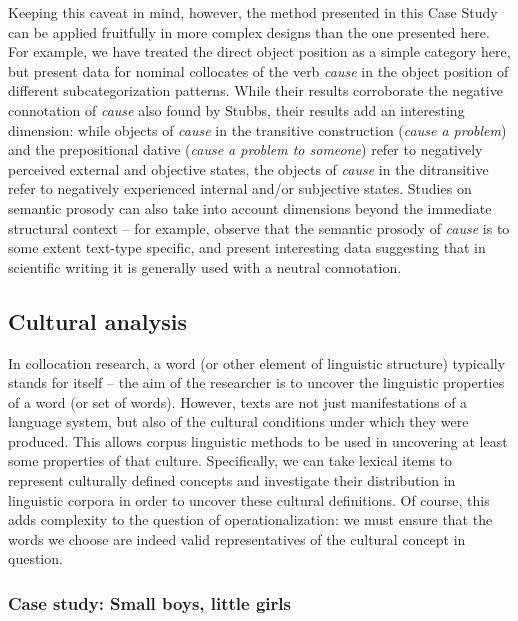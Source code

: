 Keeping this caveat in mind, however, the method presented in this Case Study can be applied fruitfully in more complex designs than the one presented here. For example, we have treated the direct object position as a simple category here, but \citet{stefanowitsch_collostructions:_2003} present data for nominal collocates of the verb \textit{cause} in the object position of different subcategorization patterns. While their results corroborate the negative connotation of \textit{cause} also found by Stubbs, their results add an interesting dimension: while objects of \textit{cause} in the transitive construction (\textit{cause a problem}) and the prepositional dative (\textit{cause a problem to someone}) refer to negatively perceived external and objective states, the objects of \textit{cause} in the ditransitive refer to negatively experienced internal and/or subjective states. Studies on semantic prosody can also take into account dimensions beyond the immediate structural context -- for example, \citet{louw_semantic_2010} observe that the semantic prosody of \textit{cause} is to some extent text-type specific, and present interesting data suggesting that in scientific writing it is generally used with a neutral connotation.

\subsection{Cultural analysis}
\label{sec:culturalanalysis}

In collocation research, a word (or other element of linguistic structure) typically stands for itself -- the aim of the researcher is to uncover the linguistic properties of a word (or set of words). However, texts are not just manifestations of a language system, but also of the cultural conditions under which they were produced. This allows corpus linguistic methods to be used in uncovering at least some properties of that culture. Specifically, we can take lexical items to represent culturally defined concepts and investigate their distribution in linguistic corpora in order to uncover these cultural definitions. Of course, this adds complexity to the question of operationalization: we must ensure that the words we choose are indeed valid representatives of the cultural concept in question.

\subsubsection{Case study: Small boys, little girls}
\label{sec:smallboyslittlegirls}

